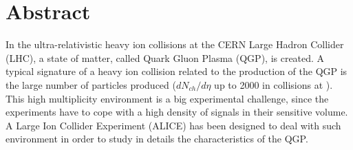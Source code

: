 %
\chapter*{Abstract}
\label{sec:abstract}
\vspace*{-10mm}

In the ultra-relativistic heavy ion collisions at the CERN Large Hadron Collider (LHC), a state of
matter, called Quark Gluon Plasma (QGP), is created.
A typical signature of a heavy ion collision related to the production of the QGP is the large
number of particles produced ($dN_{ch}/d\eta$ up to 2000 in \PbPb collisions at \sctev).
This high multiplicity environment is a big experimental challenge, since the experiments have to 
cope with a high density of signals in their sensitive volume.
A Large Ion Collider Experiment (ALICE) has been designed to deal with such environment in order to
study in details the characteristics of the QGP.


